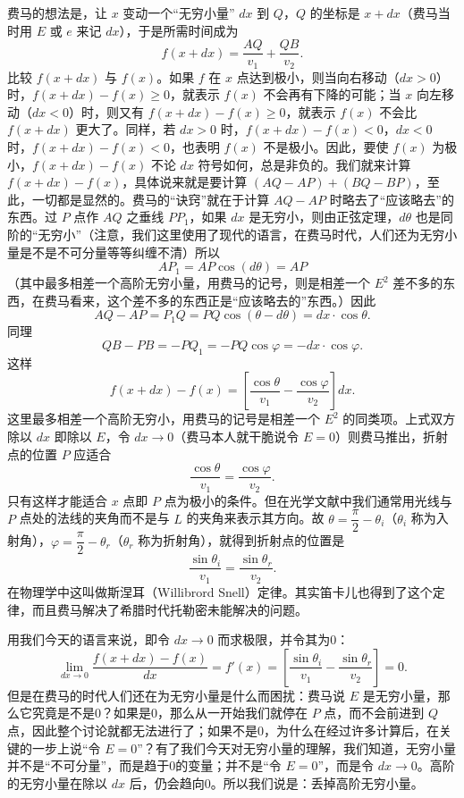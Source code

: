 费马的想法是，让 $x$ 变动一个“无穷小量” $dx$ 到 $Q$，$Q$ 的坐标是 $x+dx$（费马当时用 $E$ 或 $e$ 来记 $dx$），于是所需时间成为
\[
f(x+dx)=\frac{AQ}{v_1}+\frac{QB}{v_2}.
\]
比较 $f(x+dx)$ 与 $f(x)$。如果 $f$ 在 $x$ 点达到极小，则当向右移动（$dx>0$）时，$f(x+dx)-f(x)\ge0$，就表示 $f(x)$ 不会再有下降的可能；当 $x$ 向左移动（$dx<0$）时，则又有 $f(x+dx)-f(x)\ge0$，就表示 $f(x)$ 不会比 $f(x+dx)$ 更大了。同样，若 $dx>0$ 时，$f(x+dx)-f(x)<0$，$dx<0$ 时，$f(x+dx)-f(x)<0$，也表明 $f(x)$ 不是极小。因此，要使 $f(x)$ 为极小，$f(x+dx)-f(x)$ 不论 $dx$ 符号如何，总是非负的。我们就来计算 $f(x+dx)-f(x)$，具体说来就是要计算 $(AQ-AP)+(BQ-BP)$，至此，一切都是显然的。费马的“诀窍”就在于计算 $AQ-AP$ 时略去了“应该略去”的东西。过 $P$ 点作 $AQ$ 之垂线 $PP_1$，如果 $dx$ 是无穷小，则由正弦定理，$d\theta$ 也是同阶的“无穷小”（注意，我们这里使用了现代的语言，在费马时代，人们还为无穷小量是不是不可分量等等纠缠不清）所以
\[
AP_1=AP\cos(d\theta)=AP
\]
（其中最多相差一个高阶无穷小量，用费马的记号，则是相差一个 $E^2$ 差不多的东西，在费马看来，这个差不多的东西正是“应该略去的”东西。）因此
\[
AQ-AP=P_1Q=PQ\cos(\theta-d\theta)=dx\cdot\cos\theta.
\]
同理
\[
QB-PB=-PQ_1=-PQ\cos\varphi=-dx\cdot\cos\varphi.
\]
这样
\[
f(x+dx)-f(x)=\left[\frac{\cos\theta}{v_1}-\frac{\cos\varphi}{v_2}\right]dx.
\]
这里最多相差一个高阶无穷小，用费马的记号是相差一个 $E^2$ 的同类项。上式双方除以 $dx$ 即除以 $E$，令 $dx\to0$（费马本人就干脆说令 $E=0$）则费马推出，折射点的位置 $P$ 应适合
\[
\frac{\cos\theta}{v_1}=\frac{\cos\varphi}{v_2}.
\]
只有这样才能适合 $x$ 点即 $P$ 点为极小的条件。但在光学文献中我们通常用光线与 $P$ 点处的法线的夹角而不是与 $L$ 的夹角来表示其方向。故 $\theta=\dfrac{\pi}{2}-\theta_i$（$\theta_i$ 称为入射角），$\varphi=\dfrac{\pi}{2}-\theta_r$（$\theta_r$ 称为折射角），就得到折射点的位置是
\[
\frac{\sin\theta_i}{v_1}=\frac{\sin\theta_r}{v_2}.
\]
在物理学中这叫做斯涅耳（Willibrord Snell）定律。其实笛卡儿也得到了这个定律，而且费马解决了希腊时代托勒密未能解决的问题。

用我们今天的语言来说，即令 $dx\to0$ 而求极限，并令其为0：
\[
\lim_{dx\to0}\frac{f(x+dx)-f(x)}{dx}=f'(x)=
\left[\frac{\sin\theta_i}{v_1}-\frac{\sin\theta_r}{v_2}\right]=0.
\]
但是在费马的时代人们还在为无穷小量是什么而困扰：费马说 $E$ 是无穷小量，那么它究竟是不是0？如果是0，那么从一开始我们就停在 $P$ 点，而不会前进到 $Q$ 点，因此整个讨论就都无法进行了；如果不是0，为什么在经过许多计算后，在关键的一步上说“令 $E=0$”？有了我们今天对无穷小量的理解，我们知道，无穷小量并不是“不可分量”，而是趋于0的变量；并不是“令 $E=0$”，而是令 $dx\to0$。高阶的无穷小量在除以 $dx$ 后，仍会趋向0。所以我们说是：丢掉高阶无穷小量。

